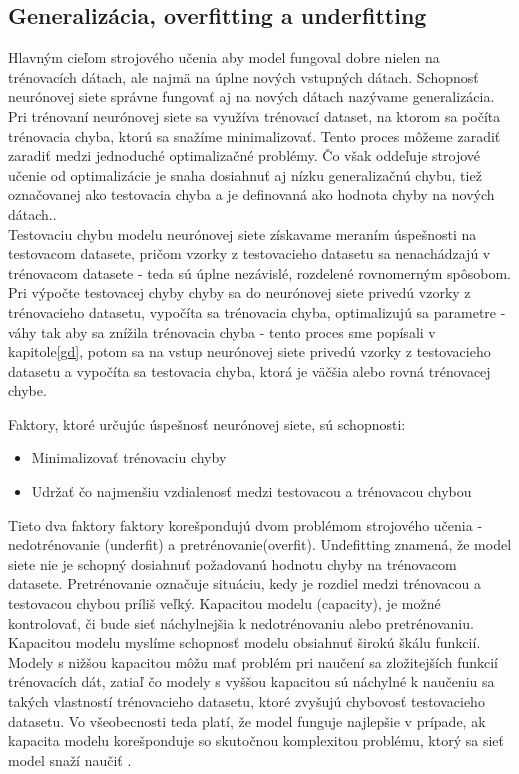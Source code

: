 \subsection{Generalizácia, overfitting a underfitting}
Hlavným cieľom strojového učenia aby model fungoval dobre nielen na trénovacích dátach, ale najmä 
na úplne nových vstupných dátach.
Schopnosť neurónovej siete správne fungovať aj na nových dátach nazývame generalizácia. \\

\indent Pri trénovaní neurónovej siete sa využíva trénovací dataset, na ktorom sa počíta trénovacia chyba, ktorú sa snažíme minimalizovať.
Tento proces môžeme zaradiť zaradiť medzi jednoduché optimalizačné problémy.
Čo však oddeľuje strojové učenie od optimalizácie je snaha dosiahnuť aj nízku generalizačnú chybu, tiež označovanej ako testovacia chyba a je  definovaná ako hodnota chyby na nových dátach.\cite{goodfellow2016deep}. \\

\indent Testovaciu chybu modelu neurónovej siete získavame meraním úspešnosti na testovacom datasete, pričom vzorky z testovacieho datasetu sa nenachádzajú v trénovacom datasete - teda sú úplne nezávislé, rozdelené rovnomerným spôsobom.
Pri výpočte testovacej chyby chyby sa do neurónovej siete privedú vzorky z trénovacieho datasetu, vypočíta sa trénovacia chyba, optimalizujú sa parametre - váhy tak aby sa znížila trénovacia chyba - tento proces sme popísali v kapitole\ref{gd}, potom sa na vstup neurónovej siete privedú vzorky z testovacieho datasetu a vypočíta sa testovacia chyba, ktorá je väčšia alebo rovná trénovacej chybe\cite{goodfellow2016deep}.

Faktory, ktoré určujúc úspešnosť neurónovej siete, sú schopnosti:

\begin{itemize}
	\item Minimalizovať trénovaciu chyby
	\item Udržať čo najmenšiu vzdialenosť medzi testovacou a trénovacou chybou
\end{itemize}
\cite{goodfellow2016deep}

\indent Tieto dva faktory faktory korešpondujú dvom problémom strojového učenia - nedotrénovanie (underfit) a pretrénovanie(overfit).
Undefitting znamená, že model siete nie je schopný dosiahnuť požadovanú hodnotu chyby na trénovacom datasete.
Pretrénovanie označuje situáciu, kedy je rozdiel medzi trénovacou a testovacou chybou príliš veľký.
Kapacitou modelu (capacity), je možné kontrolovať, či bude sieť náchylnejšia k nedotrénovaniu alebo pretrénovaniu.
Kapacitou modelu myslíme schopnosť modelu obsiahnuť širokú škálu funkcií\cite{goodfellow2016deep}.
Modely s nižšou kapacitou môžu mať problém pri naučení sa zložitejších funkcií trénovacích dát,
zatiaľ čo modely s vyššou kapacitou sú náchylné k naučeniu sa takých vlastností trénovacieho datasetu, ktoré zvyšujú chybovosť testovacieho datasetu.
Vo všeobecnosti teda platí, že model funguje najlepšie v prípade, ak kapacita modelu korešponduje so skutočnou komplexitou problému, ktorý sa sieť model snaží naučiť \cite{lawrence1997lessons}. \\

